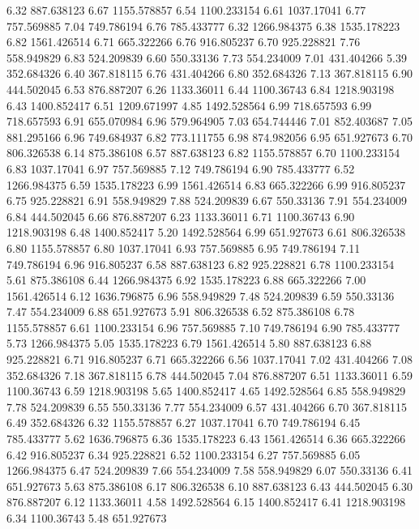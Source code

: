 6.32 	887.638123
6.67 	1155.578857
6.54 	1100.233154
6.61 	1037.17041
6.77 	757.569885
7.04 	749.786194
6.76 	785.433777
6.32 	1266.984375
6.38 	1535.178223
6.82 	1561.426514
6.71 	665.322266
6.76 	916.805237
6.70 	925.228821
7.76 	558.949829
6.83 	524.209839
6.60 	550.33136
7.73 	554.234009
7.01 	431.404266
5.39 	352.684326
6.40 	367.818115
6.76 	431.404266
6.80 	352.684326
7.13 	367.818115
6.90 	444.502045
6.53 	876.887207
6.26 	1133.36011
6.44 	1100.36743
6.84 	1218.903198
6.43 	1400.852417
6.51 	1209.671997
4.85 	1492.528564
6.99 	718.657593
6.99 	718.657593
6.91 	655.070984
6.96 	579.964905
7.03 	654.744446
7.01 	852.403687
7.05 	881.295166
6.96 	749.684937
6.82 	773.111755
6.98 	874.982056
6.95 	651.927673
6.70 	806.326538
6.14 	875.386108
6.57 	887.638123
6.82 	1155.578857
6.70 	1100.233154
6.83 	1037.17041
6.97 	757.569885
7.12 	749.786194
6.90 	785.433777
6.52 	1266.984375
6.59 	1535.178223
6.99 	1561.426514
6.83 	665.322266
6.99 	916.805237
6.75 	925.228821
6.91 	558.949829
7.88 	524.209839
6.67 	550.33136
7.91 	554.234009
6.84 	444.502045
6.66 	876.887207
6.23 	1133.36011
6.71 	1100.36743
6.90 	1218.903198
6.48 	1400.852417
5.20 	1492.528564
6.99 	651.927673
6.61 	806.326538
6.80 	1155.578857
6.80 	1037.17041
6.93 	757.569885
6.95 	749.786194
7.11 	749.786194
6.96 	916.805237
6.58 	887.638123
6.82 	925.228821
6.78 	1100.233154
5.61 	875.386108
6.44 	1266.984375
6.92 	1535.178223
6.88 	665.322266
7.00 	1561.426514
6.12 	1636.796875
6.96 	558.949829
7.48 	524.209839
6.59 	550.33136
7.47 	554.234009
6.88 	651.927673
5.91 	806.326538
6.52 	875.386108
6.78 	1155.578857
6.61 	1100.233154
6.96 	757.569885
7.10 	749.786194
6.90 	785.433777
5.73 	1266.984375
5.05 	1535.178223
6.79 	1561.426514
5.80 	887.638123
6.88 	925.228821
6.71 	916.805237
6.71 	665.322266
6.56 	1037.17041
7.02 	431.404266
7.08 	352.684326
7.18 	367.818115
6.78 	444.502045
7.04 	876.887207
6.51 	1133.36011
6.59 	1100.36743
6.59 	1218.903198
5.65 	1400.852417
4.65 	1492.528564
6.85 	558.949829
7.78 	524.209839
6.55 	550.33136
7.77 	554.234009
6.57 	431.404266
6.70 	367.818115
6.49 	352.684326
6.32 	1155.578857
6.27 	1037.17041
6.70 	749.786194
6.45 	785.433777
5.62 	1636.796875
6.36 	1535.178223
6.43 	1561.426514
6.36 	665.322266
6.42 	916.805237
6.34 	925.228821
6.52 	1100.233154
6.27 	757.569885
6.05 	1266.984375
6.47 	524.209839
7.66 	554.234009
7.58 	558.949829
6.07 	550.33136
6.41 	651.927673
5.63 	875.386108
6.17 	806.326538
6.10 	887.638123
6.43 	444.502045
6.30 	876.887207
6.12 	1133.36011
4.58 	1492.528564
6.15 	1400.852417
6.41 	1218.903198
6.34 	1100.36743
5.48 	651.927673
